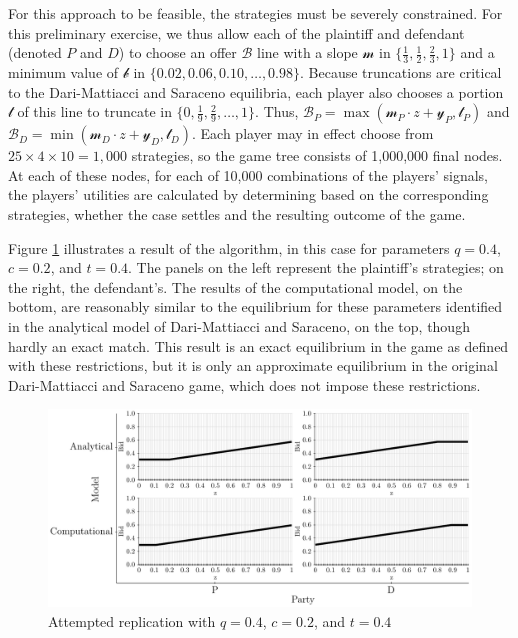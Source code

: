 \documentclass{article}
\begin{document}
For this approach to be feasible, the strategies must be severely constrained. For this preliminary exercise, we thus allow each of the plaintiff and defendant (denoted $P$ and $D$) to choose an offer $\mathcal{B}$ line with a slope $\mathcal{m}$ in $\{ \frac{1}{3}, \frac{1}{2}, \frac{2}{3}, 1 \}$ and a minimum value of $\mathcal{b}$ in $\{0.02, 0.06, 0.10, \ldots, 0.98\}$. Because truncations are critical to the Dari-Mattiacci and Saraceno equilibria, each player also chooses a portion $\mathcal{t}$ of this line to truncate in $\{0, \frac{1}{9}, \frac{2}{9}, \ldots, 1\}$. Thus, $\mathcal{B}_P = \max(\mathcal{m}_P \cdot z + \mathcal{y}_P , \mathcal{t}_P)$  and $\mathcal{B}_D = \min(\mathcal{m}_D \cdot z + \mathcal{y}_D , \mathcal{t}_D)$. Each player may in effect choose from $25 \times 4 \times 10 = 1,000$ strategies, so the game tree consists of 1,000,000 final nodes. At each of these nodes, for each of 10,000 combinations of the players' signals, the players' utilities are calculated by determining based on the corresponding strategies, whether the case settles and the resulting outcome of the game. 

Figure \ref{fig:replication1} illustrates a result of the algorithm, in this case for parameters $q = 0.4$, $c = 0.2$, and $t = 0.4$. The panels on the left represent the plaintiff's strategies; on the right, the defendant's. The results of the computational model, on the bottom, are reasonably similar to the equilibrium for these parameters identified in the analytical model of Dari-Mattiacci and Saraceno, on the top, though hardly an exact match. This result is an exact equilibrium in the game as defined with these restrictions, but it is only an approximate equilibrium in the original Dari-Mattiacci and Saraceno game, which does not impose these restrictions. 

\begin{figure}[h!]
\centering
\includegraphics[scale=0.52, trim={0in 0in 0in 0in}, clip]{../Figures/replication1.pdf}
\caption{Attempted replication with $q = 0.4$, $c = 0.2$, and $t = 0.4$}
\label{fig:replication1}
\end{figure}
\end{document}
